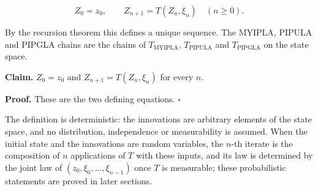 \documentclass[11pt,a4paper]{article}
\begin{document}
\[Z_0=z_0,\qquad Z_{n+1}=T(Z_n,\xi_n)\quad(n\ge0).\]


By the recursion theorem this defines a unique sequence. The MYIPLA, PIPULA and PIPGLA chains are the chains of \(T_{\mathrm{MYIPLA}}\), \(T_{\mathrm{PIPULA}}\) and \(T_{\mathrm{PIPGLA}}\) on the state space.




\textbf{Claim.} \(Z_0=z_0\) and \(Z_{n+1}=T(Z_n,\xi_n)\) for every \(n\).




\textbf{Proof.} These are the two defining equations. \(\square\)




The definition is deterministic: the innovations are arbitrary elements of the state space, and no distribution, independence or measurability is assumed. When the initial state and the innovations are random variables, the \(n\)-th iterate is the composition of \(n\) applications of \(T\) with these inputs, and its law is determined by the joint law of \((z_0,\xi_0,\dots,\xi_{n-1})\) once \(T\) is measurable; these probabilistic statements are proved in later sections.
\end{document}
